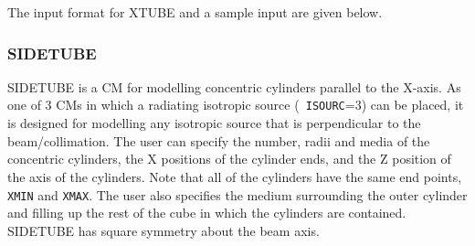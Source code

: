 \documentclass[12pt,twoside]{article}
\begin{document}
The input format for XTUBE and a sample input are given below.

\begin{small}

\end{small}

\clearpage

\subsubsection{SIDETUBE}
\renewcommand{\rightmark}{SIDETUBE CM}

SIDETUBE is a CM for modelling concentric cylinders parallel to the
X-axis.  As one of 3 CMs in which a  radiating isotropic source ({\tt
ISOURC}=3) can be placed, it is designed for modelling any isotropic
source that is perpendicular to the beam/collimation.  The user can
specify the number, radii and media of the concentric cylinders, the X
positions of the cylinder ends, and the Z position of the axis of the
cylinders.  Note that all of the cylinders have the same end points, {\tt
XMIN} and {\tt XMAX}.  The user also specifies the medium surrounding the
outer cylinder and filling up the rest of the cube in which the cylinders
are contained.  SIDETUBE has square symmetry about the beam axis.
\end{document}
